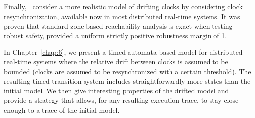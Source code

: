 Finally,~\cite{drift:surp} consider a more realistic model of drifting clocks by considering 
clock resynchronization, available now in most distributed real-time systems. It was proven
that standard zone-based reachability analysis  is exact when testing robust safety, provided
a uniform strictly positive robustness margin of 1.

In Chapter~\ref{chap:6}, we present a timed automata based model for distributed real-time
systems where the relative drift between clocks is assumed to be bounded (clocks are assumed
to be resynchronized with a certain threshold). The resulting timed transition system 
includes straightforwardly more states than the initial model. We then give interesting 
properties of the drifted model and provide a strategy that allows, for any resulting 
execution trace, to stay close enough to a  trace of the initial model. 
